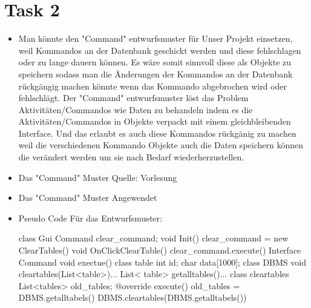 \chapter{Task 2}
\begin{itemize}
   \item Man könnte den "Command" entwurfsmuster für Unser Projekt einsetzen, weil Kommandos an der Datenbank geschickt werden und diese fehlschlagen oder zu lange dauern können. Es wäre somit sinnvoll diese als Objekte zu speichern sodass man die Änderungen der Kommandos an der Datenbank rückgängig machen könnte wenn das Kommando abgebrochen wird oder fehlschlägt. Der "Command" entwurfsmuster löst das Problem Aktivitäten/Commandos wie Daten zu behandeln indem es die Aktivitäten/Commandos in Objekte verpackt mit einem gleichbleibenden Interface. Und das erlaubt es auch diese Kommandos rückgänig zu machen weil die verschiedenen Kommando Objekte auch die Daten speichern können die verändert werden um sie nach Bedarf wiederherzustellen.
   \item Das "Command" Muster Quelle: Vorlesung
   
   \item Das "Command" Muster Angewendet
   
   \item Pseudo Code Für das Entwurfsmuster: 
   
   class Gui{
	Command  clear_command; 
	void Init(){
		clear_command = new ClearTables()
	}
	void OnClickClearTable(){
		clear_command.execute()
	}
}
Interface Command{
	void exectue()
}
class table{
	int id;
	char data[1000];
}
class DBMS{
	void cleartables(List<table>){...}
	List< table> getalltables(){...}
}
class cleartables{
	List<tables> old_tables;
	@override
	execute(){
		old_tables = DBMS.getalltabels()
		DBMS.cleartables(DBMS.getalltabels())
	}
}

\end{itemize}
